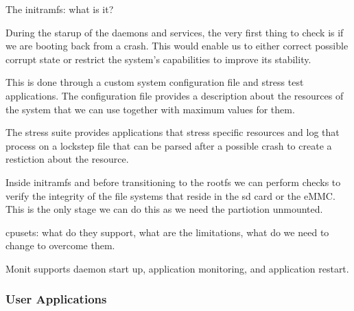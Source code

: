 The initramfs: what is it?


During the starup of the daemons and services, the very first thing to check is if we are booting back from a crash. This would enable us to either correct possible corrupt state or restrict the system's capabilities to improve its stability.

This is done through a custom system configuration file and stress test applications. The configuration file provides a description about the resources of the system that we can use together with maximum values for them.

The stress suite provides applications that stress specific resources and log that process on a lockstep file that can be parsed after a possible crash to create a restiction about the resource.


Inside initramfs and before transitioning to the rootfs we can perform checks to verify the integrity of the file systems that reside in the sd card or the eMMC. This is the only stage we can do this as we need the partiotion unmounted.

cpusets: what do they support, what are the limitations, what do we need to change to overcome them.

Monit supports daemon start up, application monitoring, and application restart.

\subsubsection{User Applications}

